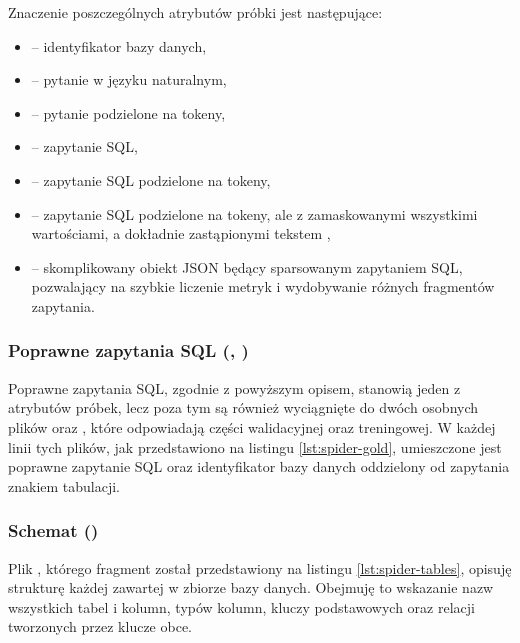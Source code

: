 \begin{minipage}{\linewidth}

\end{minipage}

Znaczenie poszczególnych atrybutów próbki jest następujące:\nobreakpar
\begin{itemize}
    \item \textbf{} -- identyfikator bazy danych,
    \item \textbf{} -- pytanie w języku naturalnym,
    \item \textbf{} -- pytanie podzielone na tokeny,
    \item \textbf{} -- zapytanie SQL,
    \item \textbf{} -- zapytanie SQL podzielone na tokeny,
    \item \textbf{} -- zapytanie SQL podzielone na tokeny, ale z zamaskowanymi wszystkimi wartościami, a dokładnie zastąpionymi tekstem ,
    \item \textbf{} -- skomplikowany obiekt JSON będący sparsowanym zapytaniem SQL, pozwalający na szybkie liczenie metryk i wydobywanie różnych fragmentów zapytania.
\end{itemize}

\subsubsection{Poprawne zapytania SQL (, )}
Poprawne zapytania SQL, zgodnie z powyższym opisem, stanowią jeden z atrybutów próbek, lecz poza tym są również wyciągnięte do dwóch osobnych plików  oraz \mbox{}, które odpowiadają części walidacyjnej oraz treningowej. W każdej linii tych plików, jak przedstawiono na listingu \ref{lst:spider-gold}, umieszczone jest poprawne zapytanie SQL oraz identyfikator bazy danych oddzielony od zapytania znakiem tabulacji.

\begin{minipage}{\linewidth}

\end{minipage}

\subsubsection{Schemat ()}
Plik , którego fragment został przedstawiony na listingu \ref{lst:spider-tables}, opisuję strukturę każdej zawartej w zbiorze  bazy danych. Obejmuję to wskazanie nazw wszystkich tabel i kolumn, typów kolumn, kluczy podstawowych oraz relacji tworzonych przez klucze obce. 

